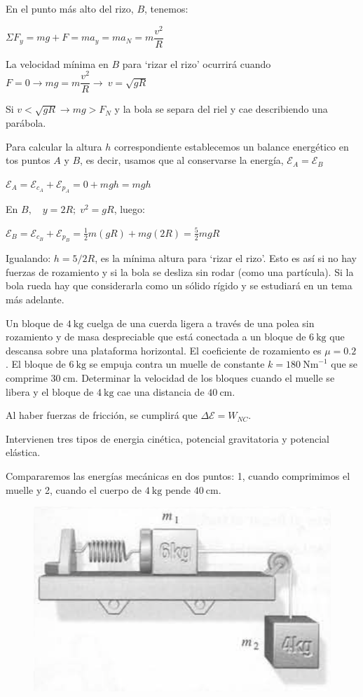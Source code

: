 En el punto más alto del rizo, $B$, tenemos:

$\Sigma F_y=mg+F=ma_y=ma_N=m\dfrac {v^2}R$

La velocidad mínima en $B$ para `rizar el rizo' ocurrirá cuando $F=0   \to mg=m\dfrac {v^2}R \to \ v=\sqrt{gR}$

Si $v < \sqrt{gR} \to mg>F_N $ y la bola se separa del riel y cae describiendo una parábola.

Para calcular la altura $h$ correspondiente establecemos un balance energético en tos puntos $A$ y $B$, es decir, usamos que al conservarse la energía, $\mathcal E_A=\mathcal E_B$

$\mathcal E_A=\mathcal E_{c_A}+\mathcal E_{p_A}=0+mgh=mgh$

En $B,\quad y=2R; \; v^2=gR$, luego:

$\mathcal E_B=\mathcal E_{c_B}+\mathcal E_{p_B}=\frac 1 2 m (gR) + mg(2R)=\frac 5 2 mgR$

Igualando: $h= 5 / 2 R$, es la mínima altura para `rizar el rizo'. Esto es así si no hay fuerzas de rozamiento y si la bola se desliza sin rodar (como una partícula). Si la bola rueda hay que considerarla como un sólido rígido y se estudiará en un tema más adelante.



\begin{prob}
	Un bloque de $4 \ \mathrm{kg}$ cuelga de una cuerda ligera a través de una polea sin rozamiento y de masa despreciable que está conectada a un bloque de $ 6 \ \mathrm{kg}$ que descansa sobre una plataforma horizontal. El coeficiente de rozamiento es $\mu=0.2$. El bloque de $6 \ \mathrm{kg}$ se empuja contra un muelle de constante $k=180\ \mathrm{Nm}^{-1}$ que se comprime $30 \ \mathrm{cm}$. Determinar la velocidad de los bloques cuando el muelle se libera y el bloque de $4 \ \mathrm{kg}$ cae una distancia de $40 \ \mathrm{cm}$.
\end{prob}

Al haber fuerzas de fricción, se cumplirá que $\Delta \mathcal E=W_{NC}$.
\begin{multicols}{2}

Intervienen tres tipos de energia cinética, potencial gravitatoria y potencial elástica.

Compararemos las energías mecánicas en dos puntos: 1, cuando comprimimos el muelle y 2, cuando el cuerpo de $4 \ \mathrm{kg}$ pende $40\ \mathrm{cm}$.
\begin{figure}[H]
	\centering
	\includegraphics[width=.55\textwidth]{imagenes/imagenes04/T04IM25.png}
\end{figure}
\end{multicols}

